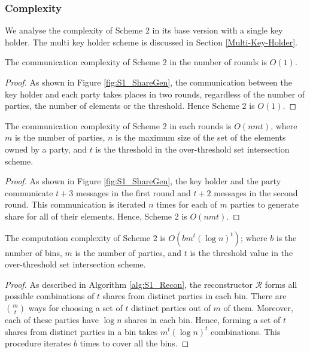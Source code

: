 \subsubsection{Complexity} We analyse the complexity of Scheme 2 in its base version with a single key holder. The multi key holder scheme is discussed in Section \ref{Multi-Key-Holder}.
\begin{theorem}
The communication complexity of Scheme 2 in the number of rounds is $O(1)$. 
\end{theorem}
\begin{proof}
As shown in Figure \ref{fig:S1_ShareGen}, the communication between the key holder and each party takes places in two rounds, regardless of the number of parties, the number of elements or the threshold. Hence Scheme 2 is $O(1)$. 
\end{proof}
\begin{theorem}
The communication complexity of Scheme 2 in each rounds is $O(nmt)$, where $m$ is the number of parties, $n$ is the maximum size of the set of the elements owned by a party, and $t$ is the threshold in the over-threshold set intersection scheme.  
\end{theorem}
\begin{proof}
As shown in Figure \ref{fig:S1_ShareGen}, the key holder and the party communicate $t+3$ messages in the first round and $t+2$ messages in the second round. This communication is iterated $n$ times for each of $m$ parties to generate share for all of their elements. Hence, Scheme 2 is $O(nmt)$.  
\end{proof}
\begin{theorem}\label{S1_ComputationComplexity}
The computation complexity of Scheme 2 is $O(b m^t (\log{n})^t)$; where $b$ is the number of bins, $m$ is the number of parties, and $t$ is the threshold value in the over-threshold set intersection scheme.
\end{theorem}
\begin{proof}
As described in Algorithm \ref{alg:S1_Recon}, the reconstructor $\mathcal{R}$ forms all possible combinations of $t$ shares from distinct parties in each bin. There are $m \choose t$ ways for choosing a set of $t$ distinct parties out of $m$ of them. Moreover, each of these parties have $\log{n}$ shares in each bin. Hence, forming a set of $t$ shares from distinct parties in a bin takes $m^t (\log{n})^t$ combinations. This procedure iterates $b$ times to cover all the bins. 
\end{proof}

